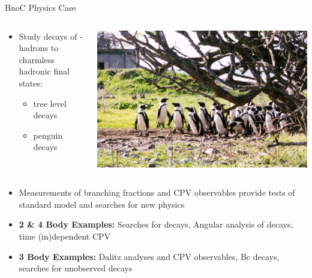 \documentclass{beamer}
\begin{document}
\begin{frame}{BnoC Physics Case}
  \begin{columns}
    \begin{column}{.5\textwidth}
      \begin{itemize}
      \item Study decays of \bquark -hadrons to charmless hadronic final states:
        \begin{itemize}
        \item \decay{\bquark}{\uquark} tree level decays
        \item \decay{\bquark}{\squark, \dquark} penguin decays
        \end{itemize}
      \end{itemize}
    \end{column}
    \begin{column}{.5\textwidth}
      \includegraphics[width=\textwidth]{PenguinTree.jpg}
    \end{column}
  \end{columns}
    \begin{itemize}
    \item Measurements of branching fractions and CPV observables provide tests of standard model and searches for new physics
    \item \textbf{2 \& 4 Body Examples:} Searches for  decays, Angular analysis of  decays, time (in)dependent CPV
    \item \textbf{3 Body Examples:} Dalitz analyses and CPV observables, Bc decays, searches for unobserved decays
    \end{itemize}
\end{frame}
\end{document}
